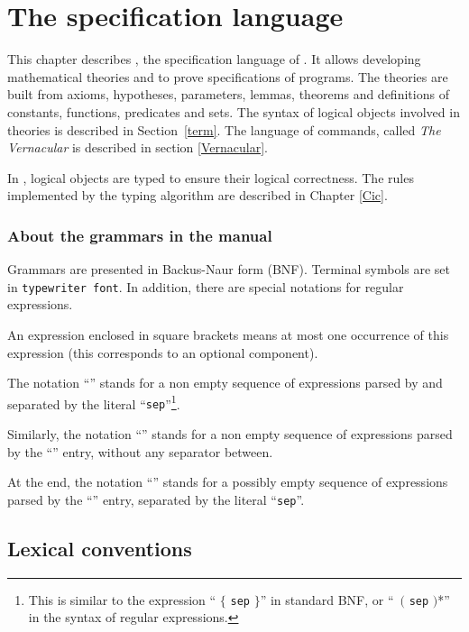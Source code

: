 \chapter{The \gallina{} specification language
\label{Gallina}}
\label{BNF-syntax} %

This chapter describes \gallina, the specification language of {\Coq}.
It allows developing mathematical theories and to prove specifications
of programs.  The theories are built from axioms, hypotheses,
parameters, lemmas, theorems and definitions of constants, functions,
predicates and sets. The syntax of logical objects involved in
theories is described in Section~\ref{term}. The language of
commands, called {\em The Vernacular} is described in section
\ref{Vernacular}.

In {\Coq}, logical objects are typed to ensure their logical
correctness. The rules implemented by the typing algorithm are described in
Chapter \ref{Cic}.

\subsection*{About the grammars in the manual
}

Grammars are presented in Backus-Naur form (BNF). Terminal symbols are
set in {\tt typewriter font}.  In addition, there are special
notations for regular expressions.

An expression enclosed in square brackets \zeroone{\ldots} means at
most one occurrence of this expression (this corresponds to an
optional component).

The notation ``'' stands for a non empty
sequence of expressions parsed by {\entry} and
separated by the literal ``{\tt sep}''\footnote{This is similar to the
expression ``{\entry} $\{$ {\tt sep} {\entry} $\}$'' in
standard BNF, or ``{\entry}~{$($} {\tt sep} {\entry} {$)$*}'' in
the syntax of regular expressions.}.

Similarly, the notation ``\nelist{\entry}{}'' stands for a non
empty sequence of expressions parsed by the ``{\entry}'' entry,
without any separator between.

At the end, the notation ``'' stands for a
possibly empty sequence of expressions parsed by the ``{\entry}'' entry,
separated by the literal ``{\tt sep}''.

\section{Lexical conventions
\label{lexical}}


